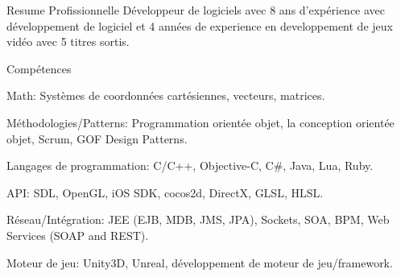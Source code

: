 \documentclass{resume}
\begin{document}
  \begin{rSection}{Resume Profissionnelle}
  Développeur de logiciels avec 8 ans d'expérience avec développement de logiciel et 4 années de experience en developpement de jeux vidéo avec 5 titres sortis. \\

    \begin{rSubsection}{Compétences}{}{}{}
      \item Math: Systèmes de coordonnées cartésiennes, vecteurs, matrices.
      \item Méthodologies/Patterns: Programmation orientée objet, la conception orientée objet, Scrum, GOF Design Patterns.
      \item Langages de programmation: C/C++, Objective-C, C\#, Java, Lua, Ruby.
      \item API: SDL, OpenGL, iOS SDK, cocos2d, DirectX, GLSL, HLSL.
      \item Réseau/Intégration: JEE (EJB, MDB, JMS, JPA), Sockets, SOA, BPM, Web Services (SOAP and REST).
      \item Moteur de jeu: Unity3D, Unreal, développement de moteur de jeu/framework.

    \end{rSubsection}
  \end{rSection}
\end{document}
